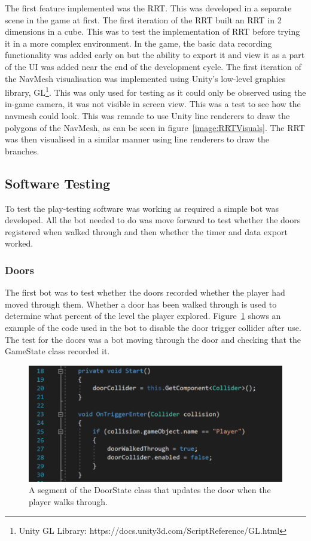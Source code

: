 \documentclass[journal]{IEEEtran}
\begin{document}
	The first feature implemented was the RRT. This was developed in a separate scene in the game at first. The first iteration of the RRT built an RRT in 2 dimensions in a cube. This was to test the implementation of RRT before trying it in a more complex environment.  In the game, the basic data recording functionality was added early on but the ability to export it and view it as a part of the UI was added near the end of the development cycle. The first iteration of the NavMesh visualisation was implemented using Unity's low-level graphics library, GL\footnote[5]{Unity GL Library: https://docs.unity3d.com/ScriptReference/GL.html}. This was only used for testing as it could only be observed using the in-game camera,  it was not visible in screen view. This was a test to see how the navmesh could look. This was remade to use Unity line renderers to draw the polygons of the NavMesh, as can be seen in figure~\ref{image:RRTVisuals}. The RRT was then visualised in a similar manner using line renderers to draw the branches. 
	
	\subsection{Software Testing} \label{softtest}
	To test the play-testing software was working as required a simple bot was developed. All the bot needed to do was move forward to test whether the doors registered when walked through and then whether the timer and data export worked.
	
	\subsubsection{Doors}
	The first bot was to test whether the doors recorded whether the player had moved through them. Whether a door has been walked through is used to determine what percent of the level the player explored. Figure~\ref{image:DoorCode} shows an example of the code used in the bot to disable the door trigger collider after use. The test for the doors was a bot moving through the door and checking that the GameState class recorded it.
	
	\begin{figure}[h]
		\includegraphics[width=1.0\linewidth]{DoorCode.png}
		\caption{A segment of the DoorState class that updates the door when the player walks through.}
		\label{image:DoorCode}
	\end{figure} 
	
\end{document}
